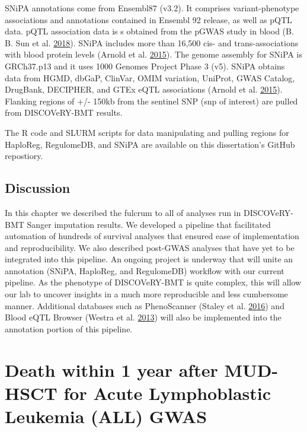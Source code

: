 \documentclass[]{DissertateOSU}
\begin{document}
SNiPA annotations come from Ensembl87 (v3.2). It comprises
variant-phenotype associations and annotations contained in Ensembl 92
release, as well as pQTL data. pQTL association data is s obtained from
the pGWAS study in blood (B. B. Sun et al.
\protect\hyperlink{ref-sun_2018}{2018}). SNiPA includes more than 16,500
cis- and trans-associations with blood protein levels (Arnold et al.
\protect\hyperlink{ref-snipa}{2015}). The genome assembly for SNiPA is
GRCh37.p13 and it uses 1000 Genomes Project Phase 3 (v5). SNiPA obtains
data from HGMD, dbGaP, ClinVar, OMIM variation, UniProt, GWAS Catalog,
DrugBank, DECIPHER, and GTEx eQTL associations (Arnold et al.
\protect\hyperlink{ref-snipa}{2015}). Flanking regions of +/- 150kb from
the sentinel SNP (snp of interest) are pulled from DISCOVeRY-BMT
results.

The R code and SLURM scripts for data manipulating and pulling regions
for HaploReg, RegulomeDB, and SNiPA are available on this dissertation's
GitHub repostiory.

\section{Discussion}\label{discussion-3}

In this chapter we described the fulcrum to all of analyses run in
DISCOVeRY-BMT Sanger imputation results. We developed a pipeline that
facilitated automation of hundreds of survival analyses that ensured
ease of implementation and reproducibility. We also described post-GWAS
analyses that have yet to be integrated into this pipeline. An ongoing
project is underway that will unite an annotation (SNiPA, HaploReg, and
RegulomeDB) workflow with our current pipeline. As the phenotype of
DISCOVeRY-BMT is quite complex, this will allow our lab to uncover
insights in a much more reproducible and less cumbersome manner.
Additional databases such as PhenoScanner (Staley et al.
\protect\hyperlink{ref-staley_2016}{2016}) and Blood eQTL Browser
(Westra et al. \protect\hyperlink{ref-westra_2013}{2013}) will also be
implemented into the annotation portion of this pipeline.

\FloatBarrier

\newpage

\pagestyle{plain} \fancyhead[L]{} \fancyhead[R]{}
\fancyfoot[C]{\thepage}

\chapter{Death within 1 year after MUD-HSCT for Acute Lymphoblastic Leukemia (ALL) GWAS}
\end{document}
